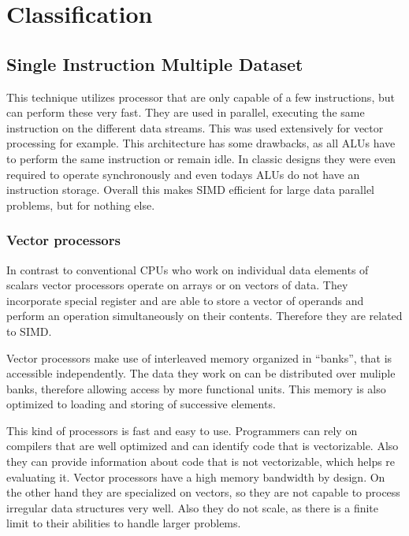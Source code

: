 \documentclass{article}
\begin{document}
\section{Classification} %
\label{sec:classification}

\subsection{Single Instruction Multiple Dataset} %
\label{sub:single_instruction_multiple_dataset}
	This technique utilizes processor that are only capable of a few instructions,
	but can perform these very fast.
	They are used in parallel, executing the same instruction on the different data streams. 
	This was used extensively for vector processing for example.
	This architecture has some drawbacks,
	as all ALUs have to perform the same instruction or remain idle.
	In classic designs they were even required to operate synchronously
	and even todays ALUs do not have an instruction storage.
	Overall this makes SIMD efficient for large data parallel problems,
	but for nothing else.

	\subsubsection{Vector processors} %
	\label{ssub:vector_processors}
	In contrast to conventional CPUs who work on individual data elements of scalars
	vector processors operate on arrays or on vectors of data.
	They incorporate special register and are able to store a vector of operands 
	and perform an operation simultaneously on their contents.
	Therefore they are related to SIMD.

	Vector processors make use of interleaved memory organized in “banks”,
	that is accessible independently.
	The data they work on can be distributed over muliple banks,
	therefore allowing access by more functional units.
	This memory is also optimized to loading and storing of successive elements.

	This kind of processors is fast and easy to use. 
	Programmers can rely on compilers that are well optimized
	and can identify code that is vectorizable.
	Also they can provide information about code that is not vectorizable,
	which helps re evaluating it.
	Vector processors have a high memory bandwidth by design.
	On the other hand they are specialized on vectors,
	so they are not capable to process irregular data structures very well.
	Also they do not scale,
	as there is a finite limit to their abilities to handle larger problems.
	
\end{document}
